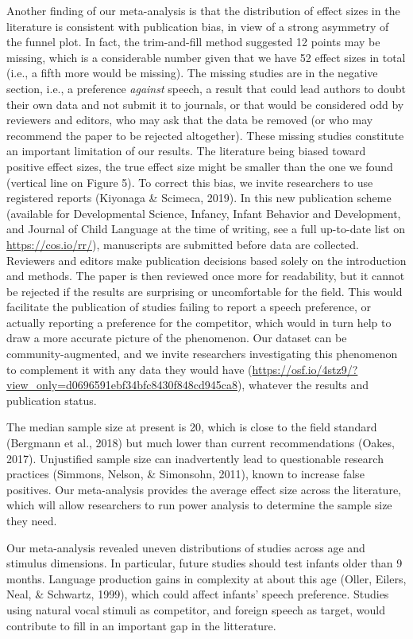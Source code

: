 \documentclass[man]{apa6}
\begin{document}
Another finding of our meta-analysis is that the distribution of effect
sizes in the literature is consistent with publication bias, in view of
a strong asymmetry of the funnel plot. In fact, the trim-and-fill method
suggested 12 points may be missing, which is a considerable number given
that we have 52 effect sizes in total (i.e., a fifth more would be
missing). The missing studies are in the negative section, i.e., a
preference \emph{against} speech, a result that could lead authors to
doubt their own data and not submit it to journals, or that would be
considered odd by reviewers and editors, who may ask that the data be
removed (or who may recommend the paper to be rejected altogether).
These missing studies constitute an important limitation of our results.
The literature being biased toward positive effect sizes, the true
effect size might be smaller than the one we found (vertical line on
Figure 5). To correct this bias, we invite researchers to use registered
reports (Kiyonaga \& Scimeca, 2019). In this new publication scheme
(available for Developmental Science, Infancy, Infant Behavior and
Development, and Journal of Child Language at the time of writing, see a
full up-to-date list on \url{https://cos.io/rr/}), manuscripts are
submitted before data are collected. Reviewers and editors make
publication decisions based solely on the introduction and methods. The
paper is then reviewed once more for readability, but it cannot be
rejected if the results are surprising or uncomfortable for the field.
This would facilitate the publication of studies failing to report a
speech preference, or actually reporting a preference for the
competitor, which would in turn help to draw a more accurate picture of
the phenomenon. Our dataset can be community-augmented, and we invite
researchers investigating this phenomenon to complement it with any data
they would have
(\url{https://osf.io/4stz9/?view_only=d0696591ebf34bfc8430f848cd945ca8}),
whatever the results and publication status.

The median sample size at present is 20, which is close to the field
standard (Bergmann et al., 2018) but much lower than current
recommendations (Oakes, 2017). Unjustified sample size can inadvertently
lead to questionable research practices (Simmons, Nelson, \& Simonsohn,
2011), known to increase false positives. Our meta-analysis provides the
average effect size across the literature, which will allow researchers
to run power analysis to determine the sample size they need.

Our meta-analysis revealed uneven distributions of studies across age
and stimulus dimensions. In particular, future studies should test
infants older than 9 months. Language production gains in complexity at
about this age (Oller, Eilers, Neal, \& Schwartz, 1999), which could
affect infants' speech preference. Studies using natural vocal stimuli
as competitor, and foreign speech as target, would contribute to fill in
an important gap in the litterature.
\end{document}
